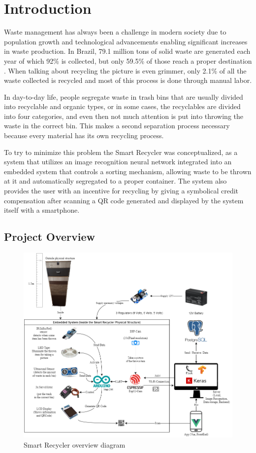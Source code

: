 \documentclass[a4paper,11pt]{article}
\begin{document}
\section{Introduction}
\label{sec:intro}
\noindent

Waste management has always been a challenge in modern society due to population growth and technological advancements enabling significant incre\-ases in waste production. In Brazil, 79.1 million tons of solid waste are generated each year \cite{Senado} of which 92\% is collected, but only 59.5\% of those reach a proper destination \cite{Senado}. When talking about recycling the picture is even grimmer, only 2.1\% of all the waste collected is recycled \cite{Poder360} and most of this process is done through manual labor.

In day-to-day life, people segregate waste in trash bins that are usually divided into recyclable and organic types, or in some cases, the recyclables are divided into four categories, and even then not much attention is put into throwing the waste in the correct bin. This makes a second separation process necessary because every material has its own recycling process.

To try to minimize this problem the Smart Recycler was conceptualized, as a system that utilizes an image recognition neural network integrated into an embedded system that controls a sorting mechanism, allowing waste to be thrown at it and automatically segregated to a proper container. The system also provides the user with an incentive for recycling by giving a symbolical credit compensation after scanning a QR code generated and displayed by the system itself with a smartphone.

\subsection{Project Overview}
\label{subsec:overview}

\begin{figure}[H]
  \centering
  \includegraphics[width=12.5cm]{Figures/SmartRecyclerDiagram.png}
  \caption{\small{Smart Recycler overview diagram}}
  \label{fig:blockDiagram}
\end{figure}
\end{document}
